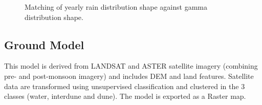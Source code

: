 \documentclass[11pt,oneside,a4paper,openright]{report}
\begin{document}
\begin{figure}[h]
\centering
\setlength\fboxsep{0pt}
\setlength\fboxrule{0.5pt}
\caption{Matching of yearly rain distribution shape against gamma distribution shape.}
\label{fig:GammaRain}
\end{figure}


\subsection{Ground Model}
This model is derived from LANDSAT and ASTER satellite imagery (combining pre- and post-monsoon
imagery) and includes DEM and land features. Satellite data are transformed using unsupervised
classification and clustered in the 3 classes (water, interdune and dune). The model is exported as a
Raster map.

\end{document}

